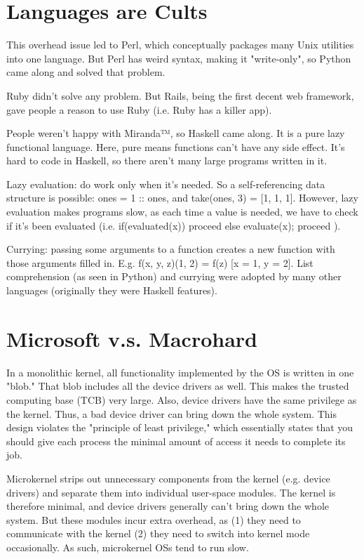 \documentclass[twoside]{article}
\begin{document}
\section{Languages are Cults}

This overhead issue led to Perl, which conceptually packages many Unix utilities into one language. But Perl has weird syntax, making it "write-only", so Python came along and solved that problem.

Ruby didn't solve any problem. But Rails, being the first decent web framework, gave people a reason to use Ruby (i.e. Ruby has a killer app).

People weren't happy with Miranda™, so Haskell came along. It is a pure lazy functional language. Here, pure means functions can't have any side effect. It's hard to code in Haskell, so there aren't many large programs written in it.

Lazy evaluation: do work only when it's needed. So a self-referencing data structure is possible: ones = 1 :: ones, and take(ones, 3) = [1, 1, 1]. However, lazy evaluation makes programs slow, as each time a value is needed, we have to check if it's been evaluated (i.e. if(evaluated(x)) { proceed } else { evaluate(x); proceed }).

Currying: passing some arguments to a function creates a new function with those arguments filled in. E.g. f(x, y, z)(1, 2) = f(z) [x = 1, y = 2]. List comprehension (as seen in Python) and currying were adopted by many other languages (originally they were Haskell features).

\section{Microsoft v.s. Macrohard}

In a monolithic kernel, all functionality implemented by the OS is written in one "blob." That blob includes all the device drivers as well. This makes the trusted computing base (TCB) very large. Also, device drivers have the same privilege as the kernel. Thus, a bad device driver can bring down the whole system. This design violates the "principle of least privilege," which essentially states that you should give each process the minimal amount of access it needs to complete its job.

Microkernel strips out unnecessary components from the kernel (e.g. device drivers) and separate them into individual user-space modules. The kernel is therefore minimal, and device drivers generally can't bring down the whole system. But these modules incur extra overhead, as (1) they need to communicate with the kernel (2) they need to switch into kernel mode occasionally. As such, microkernel OSs tend to run slow.
\end{document}
